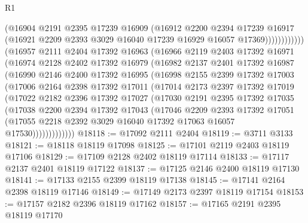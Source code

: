 \begin{lexlean}{R1}
\begin{coremodule}
                      (@16904
                        @2191
                        @2395
                        @17239
                        @16909
                        (@16912
                          @2200
                          @2394
                          @17239
                          @16917
                          (@16921 @2209 @2393 @3029 @16040 @17239 @16929 @16057 @17369))))))))))))
    (@16957
      @2111
      @2404
      @17392
      @16963
      (@16966
        @2119
        @2403
        @17392
        @16971
        (@16974
          @2128
          @2402
          @17392
          @16979
          (@16982
            @2137
            @2401
            @17392
            @16987
            (@16990
              @2146
              @2400
              @17392
              @16995
              (@16998
                @2155
                @2399
                @17392
                @17003
                (@17006
                  @2164
                  @2398
                  @17392
                  @17011
                  (@17014
                    @2173
                    @2397
                    @17392
                    @17019
                    (@17022
                      @2182
                      @2396
                      @17392
                      @17027
                      (@17030
                        @2191
                        @2395
                        @17392
                        @17035
                        (@17038
                          @2200
                          @2394
                          @17392
                          @17043
                          (@17046
                            @2209
                            @2393
                            @17392
                            @17051
                            (@17055
                              @2218
                              @2392
                              @3029
                              @16040
                              @17392
                              @17063
                              @16057
                              @17530)))))))))))))
@18118 := @17092 @2111 @2404
@18119 := @3711 @3133
@18121 := @18118 @18119 @17098
@18125 := @17101 @2119 @2403 @18119 @17106
@18129 := @17109 @2128 @2402 @18119 @17114
@18133 := @17117 @2137 @2401 @18119 @17122
@18137 := @17125 @2146 @2400 @18119 @17130
@18141 := @17133 @2155 @2399 @18119 @17138
@18145 := @17141 @2164 @2398 @18119 @17146
@18149 := @17149 @2173 @2397 @18119 @17154
@18153 := @17157 @2182 @2396 @18119 @17162
@18157 := @17165 @2191 @2395 @18119 @17170

\end{coremodule}
\end{lexlean}
